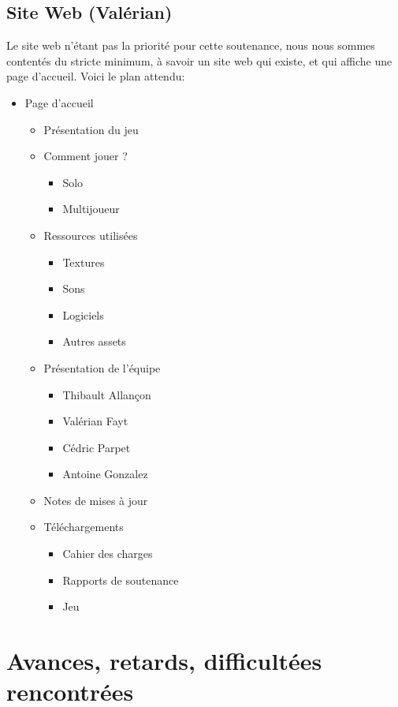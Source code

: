 \documentclass[12pt]{report}
\begin{document}
\section{Site Web (Valérian)}

Le site web n'étant pas la priorité pour cette soutenance, nous nous sommes contentés du stricte minimum, à savoir un site web qui existe, et qui affiche une page d'accueil. Voici le plan attendu:

\begin{itemize}
\item Page d'accueil
	\begin{itemize}
	\item Présentation du jeu
	\item Comment jouer ?
		\begin{itemize}
		\item Solo
		\item Multijoueur
		\end{itemize}
	\item Ressources utilisées
		\begin{itemize}
		\item Textures
		\item Sons
		\item Logiciels
		\item Autres assets
		\end{itemize}
	\item Présentation de l'équipe
		\begin{itemize}
		\item Thibault Allançon
		\item Valérian Fayt
		\item Cédric Parpet
		\item Antoine Gonzalez
		\end{itemize}
	\item Notes de mises à jour
	\item Téléchargements
		\begin{itemize}
		\item Cahier des charges
		\item Rapports de soutenance
		\item Jeu
		\end{itemize}
	\end{itemize}
\end{itemize}


\chapter{Avances, retards, difficultées rencontrées}
\end{document}

